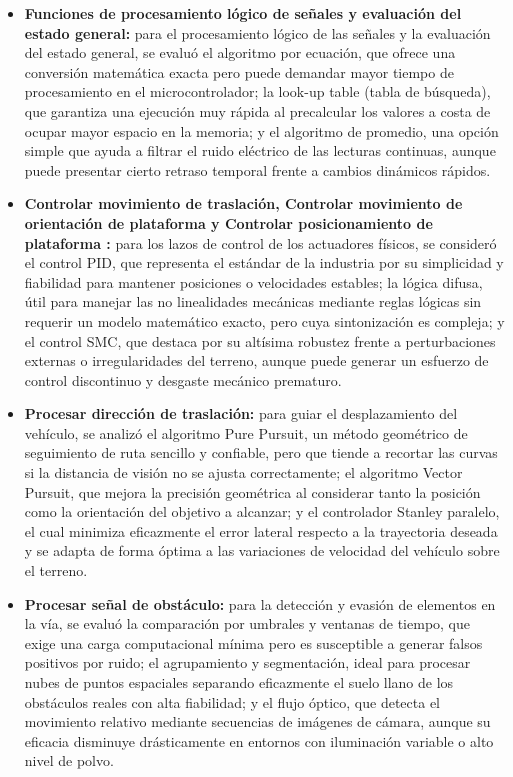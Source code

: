 \begin{itemize}
	\item \textbf{Funciones de procesamiento lógico de señales y evaluación del estado general:} para el procesamiento lógico de las señales y la evaluación del estado general, se evaluó el algoritmo por ecuación, que ofrece una conversión matemática exacta pero puede demandar mayor tiempo de procesamiento en el microcontrolador; la look-up table (tabla de búsqueda), que garantiza una ejecución muy rápida al precalcular los valores a costa de ocupar mayor espacio en la memoria; y el algoritmo de promedio, una opción simple que ayuda a filtrar el ruido eléctrico de las lecturas continuas, aunque puede presentar cierto retraso temporal frente a cambios dinámicos rápidos.
	
	\item \textbf{Controlar movimiento de traslación, Controlar movimiento de orientación de plataforma y Controlar posicionamiento de plataforma :} para los lazos de control de los actuadores físicos, se consideró el control PID, que representa el estándar de la industria por su simplicidad y fiabilidad para mantener posiciones o velocidades estables; la lógica difusa, útil para manejar las no linealidades mecánicas mediante reglas lógicas sin requerir un modelo matemático exacto, pero cuya sintonización es compleja; y el control SMC, que destaca por su altísima robustez frente a perturbaciones externas o irregularidades del terreno, aunque puede generar un esfuerzo de control discontinuo y desgaste mecánico prematuro.
	
	\item \textbf{Procesar dirección de traslación:} para guiar el desplazamiento del vehículo, se analizó el algoritmo Pure Pursuit, un método geométrico de seguimiento de ruta sencillo y confiable, pero que tiende a recortar las curvas si la distancia de visión no se ajusta correctamente; el algoritmo Vector Pursuit, que mejora la precisión geométrica al considerar tanto la posición como la orientación del objetivo a alcanzar; y el controlador Stanley paralelo, el cual minimiza eficazmente el error lateral respecto a la trayectoria deseada y se adapta de forma óptima a las variaciones de velocidad del vehículo sobre el terreno.
	
	\item \textbf{Procesar señal de obstáculo:} para la detección y evasión de elementos en la vía, se evaluó la comparación por umbrales y ventanas de tiempo, que exige una carga computacional mínima pero es susceptible a generar falsos positivos por ruido; el agrupamiento y segmentación, ideal para procesar nubes de puntos espaciales separando eficazmente el suelo llano de los obstáculos reales con alta fiabilidad; y el flujo óptico, que detecta el movimiento relativo mediante secuencias de imágenes de cámara, aunque su eficacia disminuye drásticamente en entornos con iluminación variable o alto nivel de polvo.
	

\end{itemize}
